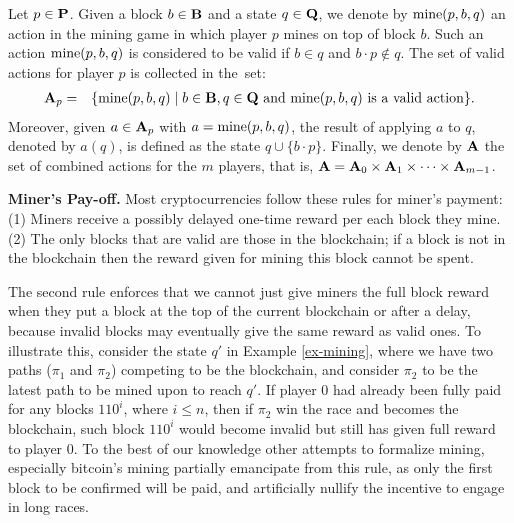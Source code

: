 Let $p \in \mathbf{P}$. Given a block $b \in \mathbf{B}$ and a state $q \in \mathbf{Q}$, we denote by $\text{\rm mine}(p,b,q)$ an action in the mining game in which player $p$ mines on top of block $b$. Such an action $\text{\rm mine}(p,b,q)$ is considered to be valid if $b \in q$ and $b\cdot p \not\in q$. The set of valid actions for player $p$ is collected in the~set:
\begin{eqnarray*}
\mathbf{A}_p & = & \{ \text{\rm mine}(p,b,q) \mid b \in \mathbf{B}, q \in \mathbf{Q} \text{ and } \text{\rm mine}(p,b,q) \text{ is a valid action}\}.
\end{eqnarray*}
Moreover, given $a \in \mathbf{A}_p$ with $a = \text{\rm mine}(p,b,q)$, the result of applying $a$ to $q$, denoted by $a(q)$, is defined as the state $q \cup \{b \cdot p\}$. Finally, we denote by $\mathbf{A}$ the set of combined actions for the $m$ players, that is, $\mathbf{A} = \mathbf{A}_0 \times \mathbf{A}_1 \times \cdots \times \mathbf{A}_{m-1}$.

\smallskip
\noindent
\textbf{Miner's Pay-off.}
Most cryptocurrencies follow these rules for miner's payment:
%
(1) Miners receive a possibly delayed one-time reward per each block they mine. %
%
(2) The only blocks that are valid are those in the blockchain; if a block is not in the blockchain then the reward given for mining this block cannot be spent. 

The second rule enforces that we cannot just give miners the full block reward when they put a block at the top of the current blockchain or after a delay, because invalid blocks may eventually give the same reward as valid ones. To illustrate this, consider the state $q'$ in Example \ref{ex-mining}, where we have two paths ($\pi_1$ and $\pi_2$) competing to be the blockchain, and consider $\pi_2$ to be the latest path to be mined upon to reach $q'$. If player $0$ had already been fully paid for any blocks $110^i$, where $i \leq n$, then if $\pi_2$ win the race and becomes the blockchain, such block $110^i$ would become invalid but still has given full reward to player $0$. To the best of our knowledge other attempts to formalize mining, especially bitcoin's mining partially emancipate from this rule, as only the first block to be confirmed will be paid, and artificially nullify the incentive to engage in long races.

